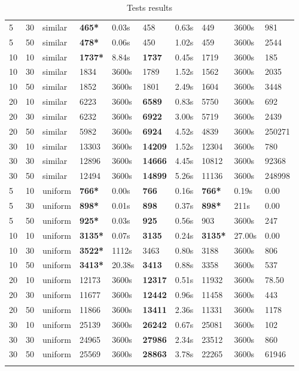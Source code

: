 \begin{scriptsize}
\begin{longtable}{@{\extracolsep{\fill}}l|l|l|ll|ll|lll@{}}
 5 & 30 & similar& \textbf{465*}& 0.03s& 458& 0.63s & 449& 3600s& 981 \\
 5 & 50 & similar& \textbf{478*}& 0.06s& 450& 1.02s & 459& 3600s& 2544 \\
 10 & 10 & similar& \textbf{1737*}& 8.84s& \textbf{1737}& 0.45s & 1719& 3600s& 185 \\
 10 & 30 & similar& 1834& 3600s& 1789& 1.52s & 1562& 3600s& 2035 \\
 10 & 50 & similar& 1852& 3600s& 1801& 2.49s & 1604& 3600s& 3448 \\
 20 & 10 & similar& 6223& 3600s& \textbf{6589}& 0.83s & 5750& 3600s& 692 \\
 20 & 30 & similar& 6232& 3600s& \textbf{6922}& 3.00s & 5719& 3600s& 2439 \\
 20 & 50 & similar& 5982& 3600s& \textbf{6924}& 4.52s & 4839& 3600s& 250271 \\
 30 & 10 & similar& 13303& 3600s& \textbf{14209}& 1.52s & 12304& 3600s& 780 \\
 30 & 30 & similar& 12896& 3600s& \textbf{14666}& 4.45s & 10812& 3600s& 92368 \\
 30 & 50 & similar& 12494& 3600s& \textbf{14899}& 5.26s & 11136& 3600s& 248998 \\
 5 & 10 & uniform& \textbf{766*}& 0.00s& \textbf{766}& 0.16s & \textbf{766*}& 0.19s & 0.00 \\
 5 & 30 & uniform& \textbf{898*}& 0.01s& \textbf{898}& 0.37s & \textbf{898*}& 211s & 0.00 \\
 5 & 50 & uniform& \textbf{925*}& 0.03s& \textbf{925}& 0.56s & 903& 3600s& 247 \\
 10 & 10 & uniform& \textbf{3135*}& 0.07s& \textbf{3135}& 0.24s & \textbf{3135*}& 27.00s & 0.00 \\
 10 & 30 & uniform& \textbf{3522*}& 1112s & 3463& 0.80s & 3188& 3600s& 806 \\
 10 & 50 & uniform& \textbf{3413*}& 20.38s& \textbf{3413}& 0.88s & 3358& 3600s& 537 \\
 20 & 10 & uniform& 12173& 3600s& \textbf{12317}& 0.51s & 11932& 3600s& 78.50 \\
 20 & 30 & uniform& 11677& 3600s& \textbf{12442}& 0.96s & 11458& 3600s& 443 \\
 20 & 50 & uniform& 11866& 3600s& \textbf{13411}& 2.36s & 11331& 3600s& 1178 \\
 30 & 10 & uniform& 25139& 3600s& \textbf{26242}& 0.67s & 25081& 3600s& 102 \\
 30 & 30 & uniform& 24965& 3600s& \textbf{27986}& 2.34s & 23512& 3600s& 860 \\
 30 & 50 & uniform& 25569& 3600s& \textbf{28863}& 3.78s & 22265& 3600s& 61946 \\
\hline 
\caption{Tests results}\\ 
\end{longtable}
\end{scriptsize}
